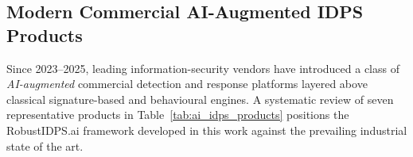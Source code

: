 \subsection{Modern Commercial AI-Augmented IDPS Products}
\label{subsec:commercial_ai_idps}


Since 2023--2025, leading information-security vendors have introduced a class of \emph{AI-augmented} commercial detection and response platforms layered above classical signature-based and behavioural engines. A systematic review of seven representative products in Table~\ref{tab:ai_idps_products} positions the RobustIDPS.ai framework developed in this work against the prevailing industrial state of the art.

